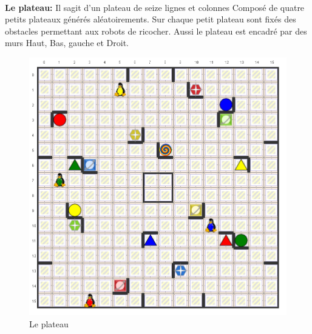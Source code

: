 \documentclass{beamer}
\begin{document}
		\begin{frame}
		\\\textbf{ Le plateau:} Il sagit d'un plateau de seize lignes et colonnes  Composé de quatre petits plateaux générés aléatoirements. Sur chaque petit plateau sont fixés des obstacles permettant aux robots de ricocher. Aussi le plateau est encadré par des murs Haut, Bas, gauche et Droit.
		
		\begin{figure}[htpb]
			\includegraphics[scale=0.15]{./images/interfaceGr.png}
			\caption{Le plateau \label{figure1} }
		\end{figure}
		
	\end{frame}
	
\end{document}
